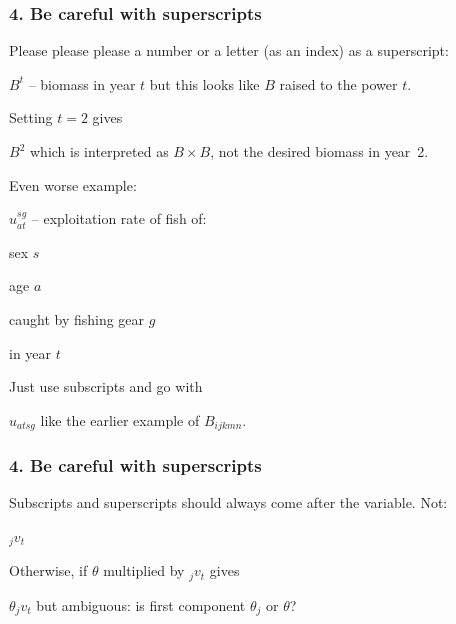 
\begin{frame}
\frametitle{4. Be careful with superscripts}

Please please please  a number or a letter (as an index) as a
superscript:
\bi
  \item $B^t$ -- biomass in year $t$
\ei
but this looks like $B$ raised to the power $t$.

Setting $t=2$ gives
\bi
  \item $B^2$
\ei
which is interpreted as $B \times B$, not the desired biomass in year~2.

\pause

Even worse example:
\bi
  \item $u_{at}^{sg}$ -- exploitation rate of fish of:
  \bi
    \item sex $s$
    \item age $a$
    \item caught by fishing gear $g$
    \item in year $t$
  \ei
\ei

Just use subscripts and go with
\bi
  \item $u_{atsg}$
\ei
like the earlier example of $B_{ijkmn}$.
\end{frame}


\begin{frame}
\frametitle{4. Be careful with superscripts}
Subscripts and superscripts should always come after the variable. Not:
\bi
  \item $_jv_t$
\ei

Otherwise, if $\theta$ multiplied by $_jv_t$ gives
\bi
  \item $\theta_jv_t$
\ei
but ambiguous: is first component $\theta_j$ or $\theta$?


\end{frame}


